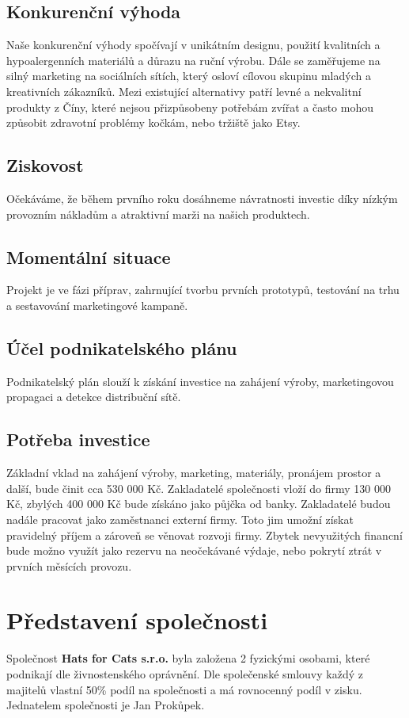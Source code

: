\documentclass[12pt, a4paper]{article}
\begin{document}
\subsection{Konkurenční výhoda}
Naše konkurenční výhody spočívají v unikátním designu, použití kvalitních a hypoalergenních materiálů a důrazu na ruční výrobu. Dále se zaměřujeme na silný marketing na sociálních sítích, který osloví cílovou skupinu mladých a kreativních zákazníků.
Mezi existující alternativy patří levné a nekvalitní produkty z Číny, které nejsou přizpůsobeny potřebám zvířat a často mohou
způsobit zdravotní problémy kočkám, nebo tržiště jako Etsy.

\subsection{Ziskovost}
Očekáváme, že během prvního roku dosáhneme návratnosti investic díky 
nízkým provozním nákladům 
a atraktivní marži na našich produktech.

\subsection{Momentální situace}
Projekt je ve fázi příprav, zahrnující tvorbu prvních prototypů, 
testování na trhu a sestavování marketingové kampaně.

\subsection{Účel podnikatelského plánu}
Podnikatelský plán slouží k získání investice na zahájení výroby, 
marketingovou propagaci a detekce distribuční sítě.

\subsection{Potřeba investice}
Základní vklad na zahájení výroby, marketing, materiály,
pronájem prostor a další, bude činit cca 530 000 Kč.
Zakladatelé společnosti vloží do firmy 130 000 Kč, zbylých 400 000 Kč bude získáno 
jako půjčka od banky. Zakladatelé budou nadále pracovat jako zaměstnanci externí firmy.
Toto jim umožní získat pravidelný příjem a zároveň se věnovat rozvoji firmy.
Zbytek nevyužitých financní bude možno využít jako rezervu na neočekávané výdaje,
nebo pokrytí ztrát v prvních měsících provozu.

\section{Představení společnosti}
Společnost \textbf{Hats for Cats s.r.o.} byla založena 2 fyzickými osobami,
které podnikají dle živnostenského oprávnění. Dle společenské smlouvy
každý z majitelů vlastní 50\% podíl na společnosti a má rovnocenný podíl v zisku.
Jednatelem společnosti je Jan Prokůpek.
\end{document}
